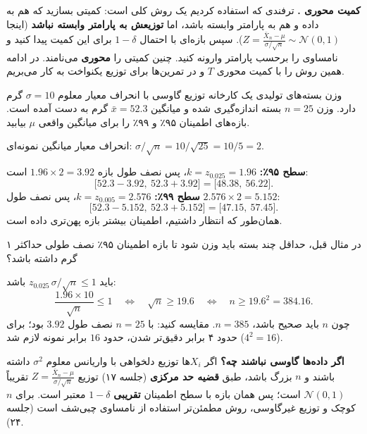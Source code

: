 \begin{note}
\notetitle \textbf{کمیت محوری .} ترفندی که استفاده کردیم یک روش کلی است: کمیتی بسازید که هم به داده و هم به پارامتر وابسته باشد، اما \textbf{توزیعش به پارامتر وابسته نباشد} (اینجا $Z=\frac{\bar X_n-\mu}{\sigma/\sqrt n}\sim\mathcal N(0,1)$). سپس بازه‌ای با احتمال $1-\delta$ برای این کمیت پیدا کنید و نامساوی را برحسب پارامتر وارونه کنید. چنین کمیتی را \textbf{محوری} می‌نامند. در ادامه همین روش را با کمیت محوری $T$ و در تمرین‌ها برای توزیع یکنواخت به کار می‌بریم.
\end{note}

\begin{example}
وزن بسته‌های تولیدی یک کارخانه توزیع گاوسی با انحراف معیار معلوم $\sigma=10$ گرم دارد. وزن $n=25$ بسته اندازه‌گیری شده و میانگین $\bar x=52.3$ گرم به دست آمده است. بازه‌های اطمینان ۹۵٪ و ۹۹٪ را برای میانگین واقعی $\mu$ بیابید.
\begin{solution}
انحراف معیار میانگین نمونه‌ای: $\sigma/\sqrt n=10/\sqrt{25}=10/5=2$.

\textbf{سطح ۹۵٪:} $k=z_{0.025}=1.96$، پس نصف طول بازه $1.96\times2=3.92$ است:
\[
\big[52.3-3.92,\ 52.3+3.92\big]=\big[48.38,\ 56.22\big].
\]
\textbf{سطح ۹۹٪:} $k=z_{0.005}=2.576$، پس نصف طول $2.576\times2=5.152$:
\[
\big[52.3-5.152,\ 52.3+5.152\big]=\big[47.15,\ 57.45\big].
\]
همان‌طور که انتظار داشتیم، اطمینان بیشتر بازه پهن‌تری داده است.
\end{solution}
\end{example}

\begin{example}
در مثال قبل، حداقل چند بسته باید وزن شود تا بازه اطمینان ۹۵٪ نصف طولی حداکثر ۱ گرم داشته باشد؟
\begin{solution}
باید $z_{0.025}\,\sigma/\sqrt n\le1$ باشد:
\[
\frac{1.96\times10}{\sqrt n}\le1\quad\Longleftrightarrow\quad\sqrt n\ge19.6\quad\Longleftrightarrow\quad n\ge19.6^2=384.16 .
\]
چون $n$ باید صحیح باشد، $n=385$. مقایسه کنید: با $n=25$ نصف طول $3.92$ بود؛ برای حدود ۴ برابر دقیق‌تر شدن، حدود $16$ برابر نمونه لازم شد ($4^2=16$).
\end{solution}
\end{example}

\begin{note}
\notetitle \textbf{اگر داده‌ها گاوسی نباشند چه؟} اگر $X_i$ها توزیع دلخواهی با واریانس معلوم $\sigma^2$ داشته باشند و $n$ بزرگ باشد، طبق \textbf{قضیه حد مرکزی} (جلسه ۱۷) توزیع $Z=\frac{\bar X_n-\mu}{\sigma/\sqrt n}$ تقریباً $\mathcal N(0,1)$ است؛ پس همان بازه با سطح اطمینان \textbf{تقریبی} $1-\delta$ معتبر است. برای $n$ کوچک و توزیع غیرگاوسی، روش مطمئن‌تر استفاده از نامساوی چبی‌شف است (جلسه ۲۴).
\end{note}

